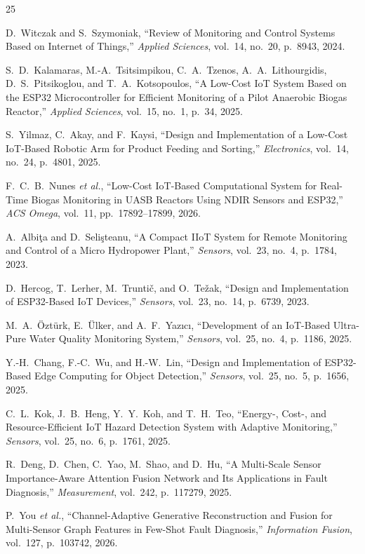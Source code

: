 \documentclass[12pt,a4paper]{article}
\begin{document}
\begin{thebibliography}{25}

D.~Witczak and S.~Szymoniak, ``Review of Monitoring and Control Systems Based on Internet of Things,'' \textit{Applied Sciences}, vol.~14, no.~20, p.~8943, 2024.

S.~D.~Kalamaras, M.-A.~Tsitsimpikou, C.~A.~Tzenos, A.~A.~Lithourgidis, D.~S.~Pitsikoglou, and T.~A.~Kotsopoulos, ``A Low-Cost IoT System Based on the ESP32 Microcontroller for Efficient Monitoring of a Pilot Anaerobic Biogas Reactor,'' \textit{Applied Sciences}, vol.~15, no.~1, p.~34, 2025.

S.~Yilmaz, C.~Akay, and F.~Kaysi, ``Design and Implementation of a Low-Cost IoT-Based Robotic Arm for Product Feeding and Sorting,'' \textit{Electronics}, vol.~14, no.~24, p.~4801, 2025.

F.~C.~B.~Nunes \textit{et al.}, ``Low-Cost IoT-Based Computational System for Real-Time Biogas Monitoring in UASB Reactors Using NDIR Sensors and ESP32,'' \textit{ACS Omega}, vol.~11, pp.~17892--17899, 2026.

A.~Albi\c{t}a and D.~Seli\c{s}teanu, ``A Compact IIoT System for Remote Monitoring and Control of a Micro Hydropower Plant,'' \textit{Sensors}, vol.~23, no.~4, p.~1784, 2023.

D.~Hercog, T.~Lerher, M.~Truntič, and O.~Težak, ``Design and Implementation of ESP32-Based IoT Devices,'' \textit{Sensors}, vol.~23, no.~14, p.~6739, 2023.

M.~A.~\"Ozt\"urk, E.~\"Ulker, and A.~F.~Yaz{\i}c{\i}, ``Development of an IoT-Based Ultra-Pure Water Quality Monitoring System,'' \textit{Sensors}, vol.~25, no.~4, p.~1186, 2025.

Y.-H.~Chang, F.-C.~Wu, and H.-W.~Lin, ``Design and Implementation of ESP32-Based Edge Computing for Object Detection,'' \textit{Sensors}, vol.~25, no.~5, p.~1656, 2025.

C.~L.~Kok, J.~B.~Heng, Y.~Y.~Koh, and T.~H.~Teo, ``Energy-, Cost-, and Resource-Efficient IoT Hazard Detection System with Adaptive Monitoring,'' \textit{Sensors}, vol.~25, no.~6, p.~1761, 2025.

R.~Deng, D.~Chen, C.~Yao, M.~Shao, and D.~Hu, ``A Multi-Scale Sensor Importance-Aware Attention Fusion Network and Its Applications in Fault Diagnosis,'' \textit{Measurement}, vol.~242, p.~117279, 2025.

P.~You \textit{et al.}, ``Channel-Adaptive Generative Reconstruction and Fusion for Multi-Sensor Graph Features in Few-Shot Fault Diagnosis,'' \textit{Information Fusion}, vol.~127, p.~103742, 2026.


\end{thebibliography}
\end{document}
